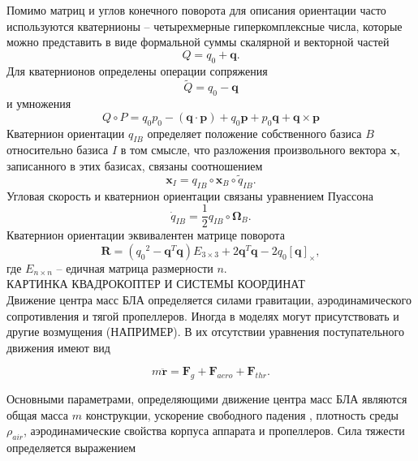 Помимо матриц и углов конечного поворота для описания ориентации часто используются кватернионы \cite{Amelkin01} -- четырехмерные гиперкомплексные числа, которые можно представить в виде формальной суммы скалярной и векторной частей
	 \begin{equation} \label{eq:quat_def}
	 Q = q_0 + \bm{q}.
	 \end{equation}
	 Для кватернионов определены операции сопряжения
	 \begin{equation} \label{eq:quat_dual}
	 \tilde{Q} = q_0 - \bm{q}
	 \end{equation}
	 и умножения
\begin{equation} \label{eq:quat_mult}
Q \circ P = q_0 p_0 - (\bm{q} \cdot \bm{p})
+ q_0 \bm{p} + p_0 \bm{q} + \bm{q} \times \bm{p}
\end{equation}
Кватернион ориентации  $q_{IB}$ определяет положение собственного базиса $B$ относительно базиса $I$ в том смысле, что разложения произвольного вектора $\bm{x}$, записанного в этих базисах, связаны соотношением
\begin{equation} \label{eq:quat}
\bm{x}_I = q_{IB} \circ \bm{x}_B \circ \tilde{q}_{IB}.
\end{equation}
Угловая скорость и кватернион ориентации связаны уравнением Пуассона
\begin{equation} \label{eq:puasson}
\dot{q}_{IB} = \frac{1}{2} {q}_{IB} \circ \bm{\Omega}_B.
\end{equation}
Кватернион ориентации эквивалентен матрице поворота
\begin{equation} \label{eq:quat_to_rotmx}
\bm{R} = ({q_0}^2 - \bm{q}^T \bm{q}) E_{3 \times 3} + 2 \bm{q}^T \bm{q} - 2 {q_0} [\bm{q}]_{\times},
\end{equation}
где $E_{n \times n}$ -- едичная матрица размерности $n$.
\\
КАРТИНКА КВАДРОКОПТЕР И СИСТЕМЫ КООРДИНАТ
\\
Движение центра масс БЛА определяется силами гравитации, аэродинамического сопротивления и тягой пропеллеров. Иногда в моделях могут присутствовать и другие возмущения (НАПРИМЕР). В их отсутствии уравнения поступательного движения имеют вид

\begin{equation} \label{eq:common_traslational_motion}
m \ddot{\bm{r}} = \bm{F}_g + \bm{F}_{aero} + \bm{F}_{thr}.
\end{equation}

Основными параметрами, определяющими движение центра масс БЛА являются общая масса {$m$} конструкции, ускорение свободного падения , плотность среды {$\rho_{air}$}, аэродинамические свойства корпуса аппарата и пропеллеров. Сила тяжести определяется выражением


